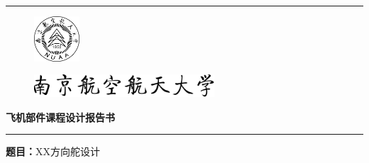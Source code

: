 
\begin{titlepage}
    \centering


    \rule{\textwidth}{1pt}   %
    \vspace{0.01\textheight}  %



    \begin{figure}[H]
    \centering
    \includegraphics[width=0.15\textwidth]{logo/nuaa-logo-black.pdf}
    \end{figure}
    
    \begin{figure}[H]
    \centering
    \includegraphics[width=0.6\textwidth]{logo/nuaa-jianqi.pdf}
    \end{figure}
    
    \vspace{0.02\textheight}
    
    {\Huge \textbf{飞机部件课程设计报告书}}
    

    \vspace{0.005\textheight}   %

    \rule{0.83\textwidth}{0.4pt}  %

    \vspace{0.05\textheight}  %


    {\Huge \textbf{题目：}XX方向舵设计}


\end{titlepage}
